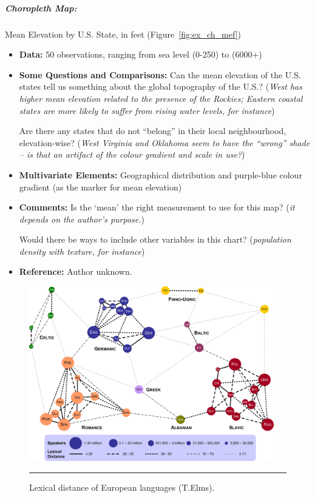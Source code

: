 \afterpage{\FloatBarrier}
\subparagraph{Choropleth Map:} Mean Elevation by U.S. State, in feet  (Figure~\ref{fig:ex_ch_mef})
\begin{itemize}[noitemsep]
\item \textbf{Data:} 50 observations, ranging from sea level (0-250) to (6000+)
\item \textbf{Some Questions and Comparisons:} Can the mean elevation of the U.S. states tell us something about the global topography of the U.S.? (\textit{West has higher mean elevation related to the presence of the Rockies; Eastern coastal states are more likely to suffer from rising water levels, for instance})\par Are there any states that do not ``belong'' in their local neighbourhood, elevation-wise? (\textit{West Virginia and Oklahoma seem to have the ``wrong'' shade -- is that an artifact of the colour gradient and scale in use?})  \item \textbf{Multivariate Elements:} Geographical distribution and purple-blue colour gradient (as the marker for mean elevation)
\item \textbf{Comments:} Is the `mean' the right measurement to use for this map? (\textit{it depends on the author's purpose.})\par Would there be ways to include other variables in this chart? (\textit{population density with texture, for instance})
\item \textbf{Reference:} Author unknown.
\end{itemize}
\newpage \begin{figure}[H]
\centering
\includegraphics[width=0.95\textwidth]{images/DV/lexical.png}
\caption[\small Network Clustering: lexical distance of European languages ]{\small Lexical distance of European languages (T.Elms).} \hrule\label{fig:ex_nd_lex}
\end{figure}
